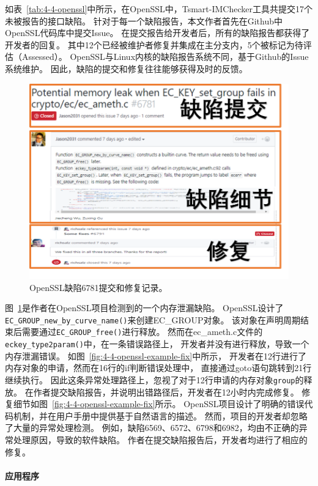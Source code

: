 如表~\ref{tab:4-4-openssl}中所示，在OpenSSL中，Tsmart-IMChecker工具共提交17个未被报告的接口缺陷。
针对于每一个缺陷报告，本文作者首先在Github中OpenSSL代码库中提交Issue。
在提交报告给开发者后，所有的缺陷报告都获得了开发者的回复。
其中12个已经被维护者修复并集成在主分支内，5个被标记为待评估（Assessed）。
OpenSSL与Linux内核的缺陷报告系统不同，基于Github的Issue系统维护。
因此，缺陷的提交和修复往往能够获得及时的反馈。

\begin{figure}[t]
	\centering
	\includegraphics[width=0.8\linewidth]{figures/cp4-openssl-example.png}
	\caption{
		OpenSSL缺陷6781提交和修复记录。
	}
	\label{fig:4-4-openssl-example}
\end{figure}

图~\ref{fig:4-4-openssl-example}是作者在OpenSSL项目检测到的一个内存泄漏缺陷。
OpenSSL设计了\texttt{EC\_GROUP\_new\_by\_curve\_name()}来创建EC\_GROUP对象。
该对象在声明周期结束后需要通过\texttt{EC\_GROUP\_free()}进行释放。
然而在ec\_ameth.c文件的\texttt{eckey\_type2param()}中，在一条错误路径上，
开发者并没有进行释放，导致一个内存泄漏错误。
如图~\ref{fig:4-4-openssl-example-fix}中所示，
开发者在12行进行了内存对象的申请，然而在16行的if判断错误处理中，
直接通过goto语句跳转到21行继续执行。
因此这条异常处理路径上，忽视了对于12行申请的内存对象\texttt{group}的释放。
在作者提交缺陷报告，并说明出错路径后，开发者在12小时内完成修复。
修复细节如图~\ref{fig:4-4-openssl-example-fix}所示。
OpenSSL项目设计了明确的错误代码机制，并在用户手册中提供基于自然语言的描述。
然而，项目的开发者却忽略了大量的异常处理检测。
例如，缺陷6569、6572、6798和6982，均由不正确的异常处理原因，导致的软件缺陷。
作者在提交缺陷报告后，开发者均进行了相应的修复。




\paragraph{应用程序}


